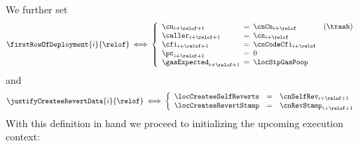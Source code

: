 	We further set
	\[
		\firstRowOfDeployment {i}{\relof}
		\iff
		\left\{ \begin{array}{lclr}
			\cn            _{i + \relof + 1} & \!\!\! = \!\!\! & \cnCn       _{i + \relof}  & (\trash) \\
			\caller        _{i + \relof + 1} & \!\!\! = \!\!\! & \cn         _{i + \relof} \\
			\cfi           _{i + \relof + 1} & \!\!\! = \!\!\! & \cnCodeCfi  _{i + \relof} \\
			\pc            _{i + \relof + 1} & \!\!\! = \!\!\! & 0                         \\
			\gasExpected   _{i + \relof + 1} & \!\!\! = \!\!\! & \locStpGasPoop            \\
		\end{array} \right.
	\]
	and
	\[
		\justifyCreateeRevertData {i}{\relof}
		\iff
		\left\{ \begin{array}{lcl}
			\locCreateeSelfReverts & = & \cnSelfRev  _{i + \relof + 1} \\
			\locCreateeRevertStamp & = & \cnRevStamp _{i + \relof + 1} \\
		\end{array} \right.
	\]
	With this definition in hand we proceed to initializing the upcoming execution context:
